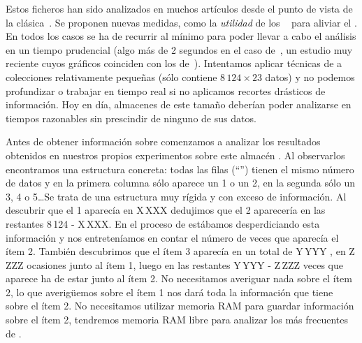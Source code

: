 Estos ficheros han sido analizados en muchos artículos desde el punto de vista de la \arm clásica~\citep{Suzuki_DiscoveringInterestingExceptionRulesWithRulePair_2004,Borgelt_EfficientImplementationsOfAprioriAndEclat_2004,ThabtahCowlingHammoud_ImprovingRuleSorting_2006,LiZhang_MiningMaximalFIOnGraphicsProcessors_2010,MalikRaheja_ImprovingPerformanceOfFrequentItemsetAlgorithm_2013,RituArora_IntensificationOfExecutionOfFrequentItemSetAlgorithms_2014,AnAlgorithmForMiningHighUtilityClosedItemsetsAndGenerators_2014}. Se proponen nuevas medidas, como la \emph{utilidad} de los \itemsets~\citep{WuShie_MiningTopKHighUtilityItemsets_2012} para aliviar el \dilemaIR. En todos los casos se ha de recurrir al \soporte mínimo para poder llevar a cabo el análisis en un tiempo prudencial (algo más de 2 segundos en el caso de~\citeauthor{RituArora_IntensificationOfExecutionOfFrequentItemSetAlgorithms_2014}, un estudio muy reciente cuyos gráficos coinciden con los de~\citeauthor{MalikRaheja_ImprovingPerformanceOfFrequentItemsetAlgorithm_2013}). Intentamos aplicar técnicas de \dm a colecciones relativamente pequeñas (\mushroom sólo contiene $8\,124 \times 23$ datos) y no podemos profundizar o trabajar en tiempo real si no aplicamos recortes drásticos de información. Hoy en día, almacenes \D de este tamaño deberían poder analizarse en tiempos razonables sin prescindir de ninguno de sus datos. 

Antes de obtener información sobre \mushroom comenzamos a analizar los resultados obtenidos en nuestros propios experimentos sobre este almacén \D. Al observarlos encontramos una estructura concreta: todas las filas ("`\transacciones"') tienen el mismo número de datos y en la primera columna sólo aparece un 1 o un 2, en la segunda sólo un 3, 4 o 5\ldots Se trata de una estructura muy rígida y con exceso de información. Al descubrir que el 1 aparecía en X\,XXX \transacciones dedujimos que el 2 aparecería en las restantes 8\,124 - X\,XXX. En el proceso de \fim estábamos desperdiciando esta información y nos entreteníamos en contar el número de veces que aparecía el ítem 2. También descubrimos que el ítem 3 aparecía en un total de Y\,YYY \transacciones, en Z\,ZZZ ocasiones junto al ítem 1, luego en las restantes Y\,YYY - Z\,ZZZ veces que aparece ha de estar junto al ítem 2. No necesitamos averiguar nada sobre el ítem 2, lo que averigüemos sobre el ítem 1 nos dará toda la información que tiene \D sobre el ítem 2. No necesitamos utilizar memoria RAM para guardar información sobre el ítem 2, tendremos memoria RAM libre para analizar los \irs más frecuentes de \D.

